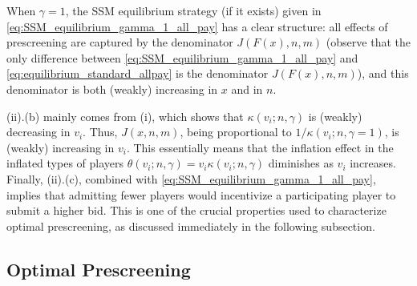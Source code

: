 When $\gamma=1$, the SSM equilibrium strategy (if it exists) given in \eqref{eq:SSM_equilibrium_gamma_1_all_pay} has a clear structure: all effects of prescreening are captured by the denominator $J(F(x),n,m)$ (observe that the only difference between \eqref{eq:SSM_equilibrium_gamma_1_all_pay} and \eqref{eq:equilibrium_standard_allpay} is the denominator $J(F(x),n,m)$), and this denominator is both (weakly) increasing in $x$ and in $n$.

 (ii).(b) mainly comes from  (i), which shows that $\kappa(v_i;n,\gamma)$ is (weakly) decreasing in $v_i$. Thus, $J(x,n,m)$, being proportional to $1/\kappa(v_i;n,\gamma=1)$, is (weakly) increasing in $v_i$. This essentially means that the inflation effect in the inflated types of players $\theta(v_i;n,\gamma)=v_i\kappa(v_i;n,\gamma)$ diminishes as $v_i$ increases. Finally,  (ii).(c), combined with \eqref{eq:SSM_equilibrium_gamma_1_all_pay}, implies that admitting fewer players would incentivize a participating player to submit a higher bid. This is one of the crucial properties used to characterize optimal prescreening, as discussed immediately in the following subsection.







\subsection{Optimal Prescreening}
\label{subsec:optimal_number_allpay}





